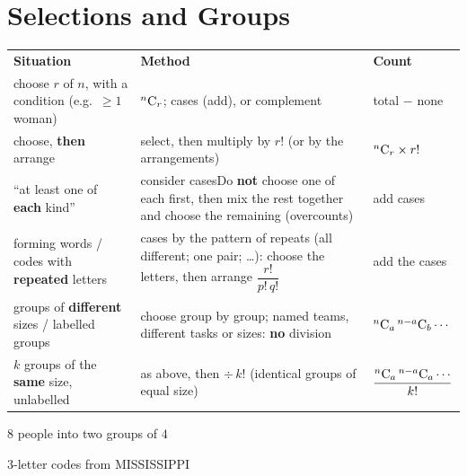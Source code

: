 \section{Selections and Groups}
\begin{center}\renewcommand{\arraystretch}{1.0}\small
\begin{tabular}{|L{4.6cm}|L{6.4cm}|M{4.2cm}|}\hline
\textbf{Situation} & \textbf{Method} & \textbf{Count}\\\Xhline{2pt}
choose $r$ of $n$, with a condition (e.g.\ $\geq1$ woman) & ${}^{n}\mathrm{C}_{r}$; cases (add), or complement & total $-$ none\\\hline
choose, \textbf{then} arrange & select, then multiply by $r!$ (or by the arrangements) & ${}^{n}\mathrm{C}_{r}\times r!$\\\hline
``at least one of \textbf{each} kind'' & consider cases\newline Do \textbf{not} choose one of each first, then mix the rest together and choose the remaining (overcounts) & add cases\\\hline
forming words / codes with \textbf{repeated} letters & cases by the pattern of repeats (all different; one pair; \ldots): choose the letters, then arrange $\dfrac{r!}{p!\,q!}$ & add the cases\\\hline
groups of \textbf{different} sizes / labelled groups & choose group by group; named teams, different tasks or sizes: \textbf{no} division & ${}^{n}\mathrm{C}_{a}\,{}^{n-a}\mathrm{C}_{b}\cdots$\\\hline
$k$ groups of the \textbf{same} size, unlabelled & as above, then $\div\,k!$ (identical groups of equal size) & $\dfrac{{}^{n}\mathrm{C}_{a}\,{}^{n-a}\mathrm{C}_{a}\cdots}{k!}$\\\hline
\end{tabular}\end{center}
\noindent\begin{minipage}[t]{0.30\textwidth}
\exlab $8$ people into two groups of $4$
\end{minipage}\hfill
\begin{minipage}[t]{0.33\textwidth}
\exlab $3$-letter codes from MISSISSIPPI
\end{minipage}\hfill
